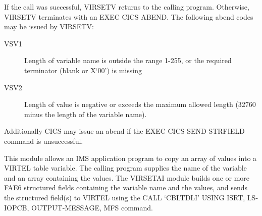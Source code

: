 \documentclass[letterpaper,10pt,english]{sphinxmanual}
\begin{document}

\begin{sphinxVerbatim}[commandchars=\\\{\}]
 
     
     
   
     
   
  
  
\end{sphinxVerbatim}



If the call was successful, VIRSETV returns to the calling program. Otherwise, VIRSETV terminates with an EXEC CICS ABEND.
The following abend codes may be issued by VIRSETV:
\begin{description}
\item[{VSV1}] \leavevmode
Length of variable name is outside the range 1-255, or the required terminator (blank or X‘00’) is missing

\item[{VSV2}] \leavevmode
Length of value is negative or exceeds the maximum allowed length (32760 minus the length of the variable name).

\end{description}

Additionally CICS may issue an abend if the EXEC CICS SEND STRFIELD command is unsuccessful.


This module allows an IMS application program to copy an array of values into a VIRTEL table variable. The calling
program supplies the name of the variable and an array containing the values. The VIRSETAI module builds one or
more FAE6 structured fields containing the variable name and the values, and sends the structured field(s) to VIRTEL
using the CALL ‘CBLTDLI’ USING ISRT, LS-IOPCB, OUTPUT-MESSAGE, MFS command.
\end{document}
